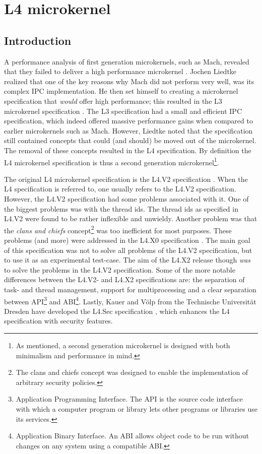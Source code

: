 \section{L4 microkernel}

\subsection{Introduction}
A performance analysis of first generation microkernels, such as Mach, revealed that they failed to deliver a high performance microkernel \cite{hartig97performance}. Jochen Liedtke realized that one of the key reasons why Mach did not perform very well, was its complex IPC implementation. He then set himself to creating a microkernel specification that \textit{would} offer high performance; this resulted in the L3 microkernel specification \cite{metterhausen96l3}. The L3 specification had a small and efficient IPC specification, which indeed offered massive performance gains when compared to earlier microkernels such as Mach. However, Liedtke noted that the specification still contained concepts that could (and should) be moved out of the microkernel. The removal of these concepts resulted in the L4 specification. By definition the L4 microkernel specification is thus a second generation microkernel\footnote{As mentioned, a second generation microkernel is designed with both minimalism and performance in mind.}.\emptyline

The original L4 microkernel specification is the L4.V2 specification \cite{liedtke96reference}. When the L4 specification is referred to, one usually refers to the L4.V2 specification. However, the L4.V2 specification had some problems associated with it. One of the biggest problems was with the thread ids. The thread ids as specified in L4.V2 were found to be rather inflexible and unwieldy. Another problem was that the \emph{clans and chiefs} concept\footnote{The clans and chiefs concept was designed to enable the implementation of arbitrary security policies.} was too inefficient for most purposes. These problems (and more) were addressed in the L4.X0 specification \cite{liedtke99reference}. The main goal of this specification was not to solve all problems of the L4.V2 specification, but to use it as an experimental test-case. The aim of the L4.X2 release \cite{liedtke04reference} though \textsl{was} to solve the problems in the L4.V2 specification. Some of the more notable differences between the L4.V2- and L4.X2 specifications are: the separation of task- and thread management, support for multiprocessing and a clear separation between API\footnote{Application Programming Interface. The API is the source code interface with which a computer program or library lets other programs or libraries use its services.} and ABI\footnote{Application Binary Interface. An ABI allows object code to be run without changes on any system using a compatible ABI.}. Lastly, Kauer and V{\"o}lp from the Technische Universit{\"a}t Dresden have developed the L4.Sec specification \cite{kauer05reference}, which enhances the L4 specification with security features.

